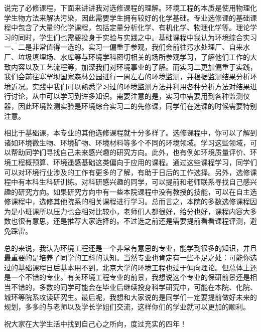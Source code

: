 \documentclass[11pt,oneside]{book}
\begin{document}
\vspace{10pt}

说完了必修课程，下面来讲讲我对选修课程的理解。环境工程的本质是使用物理化学生物方法来解决污染，因此需要学生拥有较好的化学基础。专业选修课的基础课程中包含了大量的化学课程，包括定量分析化学、有机化学、物理化学等。理论学习的同时，学生们也需要投身于实验与实践之中。基础课程中我认为环境综合实习一、二是非常值得一选的。实习一偏重于参观，我们会前往污水处理厂、自来水厂、垃圾填埋场、水库等与环境学科密切相关的场所参观学习，了解他们工作的大致内容以及工艺流程等，加深我们对环境事业的了解。而实习二更加偏重于实践，我们会前往塞罕坝国家森林公园进行一周左右的环境监测，并根据监测结果分析环境近况。实践中我们可以熟悉学习过的环境监测方法并利用各种分析方法对结果进行讨论，从中可以学习到许多知识。需要注意的是，实习中需要用到各种监测仪器，因此环境监测实验是环境综合实习二的先修课，同学们在选课的时候需要特别注意。

\vspace{10pt}

相比于基础课，本专业的其他选修课程就十分多样了。选修课程中，你可以了解到诸如环境微生物、环境矿物、环境材料等多个不同的环境领域。学习这些领域，可以帮助同学们寻找自己未来感兴趣的研究方向。此外，也有例如环境质量评价、环境工程概预算、环境遥感基础这类偏向于应用的课程。通过这些课程学习，同学们可以对环境行业涉及的工作有更多的了解，有助于日后的工作选择。另外，选修课程中有本科生科研训练。对科研感兴趣的同学，可以提前和老师联系寻找自己感兴趣的研究方向。如果研究方向中有一些本院课程中没有教授的技能，可以在自主选修课程中，选修其他院系的相关课程进行学习。总而言之，本院的多数选修课程因为是小班课所以压力也会相对比较小，老师们人都很好，给分也好，课程内容大多数也很有意思，还是推荐大家选择的。不过选之前还是需要提前看看课程评测，避免踩雷。

\vspace{10pt}

总的来说，我认为环境工程还是一个非常有意思的专业，能学到很多的知识，并且最重要的是培养了同学的工科的认知。当然专业也肯定有一些不足之处：可能你选过的基础课程日后基本用不到，北京大学的环境工程也过于偏向理论。但总体上还是一个不错的专业。有关环境工程专业的前景，我想说这个专业的保研前景还是相当不错的，多数的同学可能会在毕业后继续投身科学研究中，可能在本院、化院、城环等院系攻读研究生。最后呢，我想和大家说的是同学们一定要提前做好未来的规划，多多的与老师以及学长学姐们交流，这样你们的学业就可以更加的顺利。

\vspace{10pt}

祝大家在大学生活中找到自己心之所向，度过充实的四年！
\end{document}
